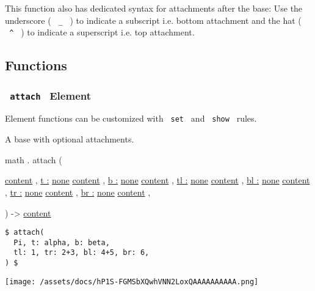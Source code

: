 This function also has dedicated syntax for attachments after the base:
Use the underscore ( \texttt{\ \_\ } ) to indicate a subscript i.e.
bottom attachment and the hat ( \texttt{\ \^{}\ } ) to indicate a
superscript i.e. top attachment.

\subsection{Functions}\label{functions}

\subsubsection{\texorpdfstring{\texttt{\ attach\ } {{ Element
}}}{ attach   Element }}\label{functions-attach}

\label{functions-attach-element-tooltip}
Element functions can be customized with \texttt{\ set\ } and
\texttt{\ show\ } rules.

A base with optional attachments.

math { . } { attach } (

{ \href{/docs/reference/foundations/content/}{content} , } {
\hyperref[functions-attach-parameters-t]{t :}
\href{/docs/reference/foundations/none/}{none}
\href{/docs/reference/foundations/content/}{content} , } {
\hyperref[functions-attach-parameters-b]{b :}
\href{/docs/reference/foundations/none/}{none}
\href{/docs/reference/foundations/content/}{content} , } {
\hyperref[functions-attach-parameters-tl]{tl :}
\href{/docs/reference/foundations/none/}{none}
\href{/docs/reference/foundations/content/}{content} , } {
\hyperref[functions-attach-parameters-bl]{bl :}
\href{/docs/reference/foundations/none/}{none}
\href{/docs/reference/foundations/content/}{content} , } {
\hyperref[functions-attach-parameters-tr]{tr :}
\href{/docs/reference/foundations/none/}{none}
\href{/docs/reference/foundations/content/}{content} , } {
\hyperref[functions-attach-parameters-br]{br :}
\href{/docs/reference/foundations/none/}{none}
\href{/docs/reference/foundations/content/}{content} , }

) -\textgreater{} \href{/docs/reference/foundations/content/}{content}

\begin{verbatim}
$ attach(
  Pi, t: alpha, b: beta,
  tl: 1, tr: 2+3, bl: 4+5, br: 6,
) $
\end{verbatim}

\texttt{[image: /assets/docs/hP1S-FGMSbXQwhVNN2LoxQAAAAAAAAAA.png]}

